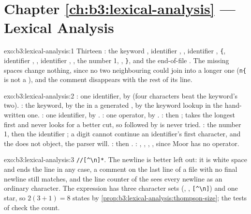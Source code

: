 \section*{Chapter \ref{ch:b3:lexical-analysis} --- Lexical Analysis}

\begin{solution}{exo:b3:lexical-analysis:1}
Thirteen : the keyword , identifier , \code{<=}, identifier , \texttt{\{}, identifier , \code{=}, identifier , \code{+}, the number 1, \code{;}, \texttt{\}}, and the end-of-file . The missing spaces change nothing, since no two neighbouring  could join into a longer one (\texttt{n\{} is not a ), and the comment  disappears with the rest of its line.
\end{solution}

\begin{solution}{exo:b3:lexical-analysis:2}
: one identifier, by  (four characters beat the keyword's two). : the keyword, by the  in a generated , by the keyword lookup in the hand-written one. : one identifier, by . \code{<=}: one operator, by . \code{<==}: \code{<=} then \code{=};  takes the longest  first and never looks for a better cut, so \code{<} followed by \code{==} is never tried. : the number 1, then the identifier ; a digit cannot continue an identifier's first character, and the  does not object, the parser will. \code{->-}: \code{->} then \code{-}. : , \code{-}, \code{-}, , since Moor has no \code{--} operator.
\end{solution}

\begin{solution}{exo:b3:lexical-analysis:3}
\texttt{//[\textasciicircum\textbackslash n]*}. The newline is better left out: it is white space and ends the line in any case, a comment on the last line of a file with no final newline still matches, and the line counter of the  sees every newline as an ordinary character. The expression has three character sets (\code{/}, \code{/}, \texttt{[\textasciicircum\textbackslash n]}) and one star, so $2(3 + 1) = 8$ states by \cref{prop:b3:lexical-analysis:thompson-size}; the tests of  check the count.
\end{solution}

